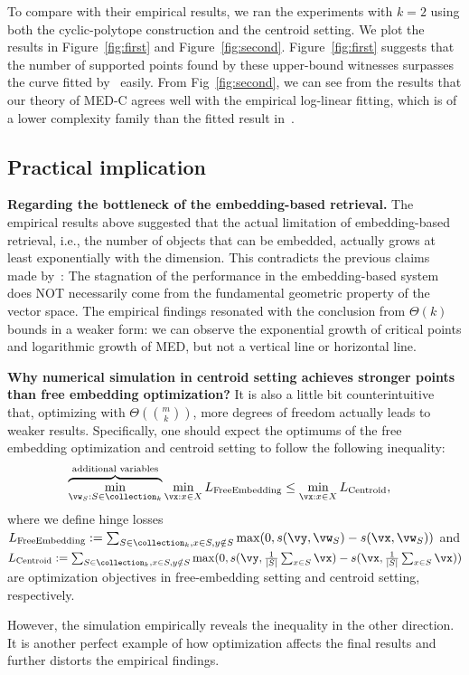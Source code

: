 To compare with their empirical results, we ran the experiments with $k=2$ using both the cyclic-polytope construction and the centroid setting. We plot the results in Figure~\ref{fig:first} and Figure~\ref{fig:second}. Figure~\ref{fig:first} suggests that the number of supported points found by these upper-bound witnesses surpasses the curve fitted by~\citet{weller2025theoretical} easily. From Fig~\ref{fig:second}, we can see from the results that our theory of MED-C agrees well with the empirical log-linear fitting, which is of a lower complexity family than the fitted result in~\citet{weller2025theoretical}.



\subsection{Practical implication}

\noindent\textbf{Regarding the bottleneck of the embedding-based retrieval.} The empirical results above suggested that the actual limitation of embedding-based retrieval, i.e., the number of objects that can be embedded, actually grows at least exponentially with the dimension. This contradicts the previous claims made by~\citet{weller2025theoretical}: The stagnation of the performance in the embedding-based system does NOT necessarily come from the fundamental geometric property of the vector space. The empirical findings resonated with the conclusion from $\Theta(k)$ bounds in a weaker form: we can observe the exponential growth of critical points and logarithmic growth of MED, but not a vertical line or horizontal line.

\noindent\textbf{Why numerical simulation in centroid setting achieves stronger points than free embedding optimization?}
It is also a little bit counterintuitive that, optimizing with $\Theta(\binom{m}{k})$, more degrees of freedom actually leads to weaker results. Specifically, one should expect the optimums of the free embedding optimization and centroid setting to follow the following inequality:
\begin{align*}
    &\overbrace{\min_{\vw_S: S\in \collection_k}}^{\text{additional variables}} \min_{\vx: x\in X}  L_{\rm Free Embedding} \leq \min_{\vx: x\in X} L_{\rm Centroid},
\end{align*}
where we define hinge losses $L_{\rm Free Embedding} := \sum_{S \in \collection_k,x\in S,y\notin S}\max(0, s(\vy, \vw_S) - s(\vx, \vw_S))$ and $L_{\rm Centroid} :=  \sum_{S \in \collection_k,x\in S,y\notin S}\max(0, s(\vy, \frac{1}{|S|}\sum_{x\in S} \vx) - s(\vx, \frac{1}{|S|}\sum_{x\in S} \vx))$ are optimization objectives in free-embedding setting and centroid setting, respectively.

However, the simulation empirically reveals the inequality in the other direction. It is another perfect example of how optimization affects the final results and further distorts the empirical findings.
